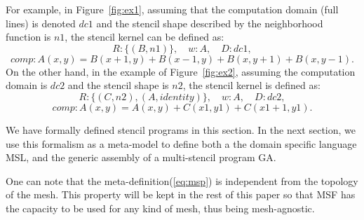 For example, in Figure~\ref{fig:ex1}, assuming that the computation domain (full lines) is denoted $dc1$ and the stencil shape described by the neighborhood function is $n1$, the stencil kernel can be defined as:
\begin{equation*}
R: \{(B,n1)\}, \quad w: A, \quad D: dc1,
\end{equation*}
\begin{equation*}
comp: A(x,y)=B(x+1,y)+B(x-1,y)+B(x,y+1)+B(x,y-1).
\end{equation*}
On the other hand, in the example of Figure~\ref{fig:ex2}, assuming the computation domain is $dc2$ and the stencil shape is $n2$, the stencil kernel is defined as:
\begin{equation*}
R: \{(C,n2),(A,identity)\}, \quad w: A, \quad D: dc2,
\end{equation*}
\begin{equation*}
comp: A(x,y)=A(x,y)+C(x1,y1)+C(x1+1,y1).
\end{equation*}

\medskip
We have formally defined stencil programs in this section. In the next section, we use this formalism as a meta-model to define both a the domain specific language MSL, and the generic assembly of a multi-stencil program GA.

One can note that the meta-definition(\ref{eq:msp}) is independent from the topology of the mesh. This property will be kept in the rest of this paper so that MSF has the capacity to be used for any kind of mesh, thus being mesh-agnostic.
